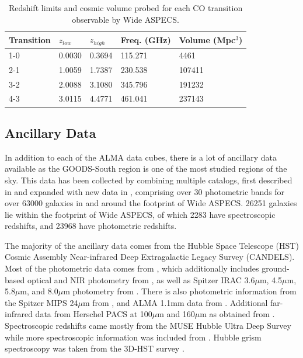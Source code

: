 \begin{table}[!htb]
\caption{Redshift limits and cosmic volume probed for each CO transition observable by Wide ASPECS.}
\begin{tabular}{lllll}\label{table:CO_freq}
Transition & $z_{low}$ & $z_{high}$ & Freq. (GHz) & Volume (Mpc$^3$) \\
\hline
1-0        & 0.0030    & 0.3694     & 115.271     & 4461             \\
2-1        & 1.0059    & 1.7387     & 230.538     & 107411           \\
3-2        & 2.0088    & 3.1080     & 345.796     & 191232           \\
4-3        & 3.0115    & 4.4771     & 461.041     & 237143          
\end{tabular}
\end{table}

\subsection{Ancillary Data}\label{sec:ancillary}

In addition to each of the ALMA data cubes, there is a lot of ancillary data available as the GOODS-South region is one of the most studied regions of the sky. This data has been collected by combining multiple catalogs, first described in \cite{walter2016alma} and expanded with new data in \cite{decarli2019alma}, comprising over 30 photometric bands for over 63000 galaxies in and around the footprint of Wide ASPECS. 26251 galaxies lie within the footprint of Wide ASPECS, of which 2283 have spectroscopic redshifts, and 23968 have photometric redshifts. 

The majority of the ancillary data comes from the Hubble Space Telescope (HST) Cosmic Assembly Near-infrared Deep Extragalactic Legacy Survey (CANDELS)\cite{grogin2011candels, Koekemoer_2011}. Most of the photometric data comes from \cite{skelton20143d}, which additionally includes ground-based optical and NIR photometry from \cite{nonino2009deep, hildebrandt2006gabods, erben2005gabods, retzlaff2010great, Hsieh_2012, 2008ApJ...682..985W, cardamone2010multiwavelength}, as well as Spitzer IRAC 3.6$\mu$m, 4.5$\mu$m, 5.8$\mu$m, and 8.0$\mu$m photometry from \cite{dickinson2003evolution, elbaz2011goods, 2013ApJ...769...80A}. There is also photometric information from the Spitzer MIPS 24$\mu$m from \cite{Whitaker_2014}, and ALMA 1.1mm data from \cite{franco2018goods}. Additional far-infrared data from Herschel PACS at 100$\mu$m and 160$\mu$m as obtained from \cite{elbaz2011goods}. Spectroscopic redshifts came mostly from the MUSE Hubble Ultra Deep Survey \cite{bacon2017, inami2017} while more spectroscopic information was included from \cite{le2005vimos, coe2006galaxies, skelton20143d, morris2015wfc3}. Hubble grism spectroscopy was taken from the 3D-HST survey \cite{momcheva20163d}.

